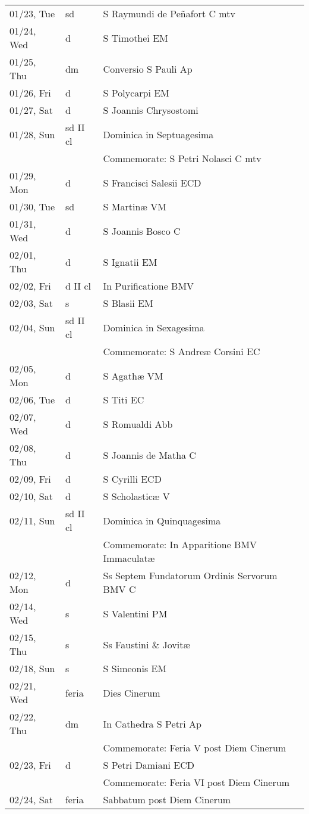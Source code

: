 \documentclass{article}
\begin{document}
\begin{longtable}{ l l l }
01/23, Tue & sd & S Raymundi de Peñafort C mtv\\
01/24, Wed & d & S Timothei EM\\
01/25, Thu & dm & Conversio S Pauli Ap\\
01/26, Fri & d & S Polycarpi EM\\
01/27, Sat & d & S Joannis Chrysostomi\\
01/28, Sun & sd II cl & Dominica in Septuagesima\\
 & & Commemorate: S Petri Nolasci C mtv\\
01/29, Mon & d & S Francisci Salesii ECD\\
01/30, Tue & sd & S Martinæ VM\\
01/31, Wed & d & S Joannis Bosco C\\
02/01, Thu & d & S Ignatii EM\\
02/02, Fri & d II cl & In Purificatione BMV\\
02/03, Sat & s & S Blasii EM\\
02/04, Sun & sd II cl & Dominica in Sexagesima\\
 & & Commemorate: S Andreæ Corsini EC\\
02/05, Mon & d & S Agathæ VM\\
02/06, Tue & d & S Titi EC\\
02/07, Wed & d & S Romualdi Abb\\
02/08, Thu & d & S Joannis de Matha C\\
02/09, Fri & d & S Cyrilli ECD\\
02/10, Sat & d & S Scholasticæ V\\
02/11, Sun & sd II cl & Dominica in Quinquagesima\\
 & & Commemorate: In Apparitione BMV Immaculatæ\\
02/12, Mon & d & Ss Septem Fundatorum Ordinis Servorum BMV C\\
02/14, Wed & s & S Valentini PM\\
02/15, Thu & s & Ss Faustini \& Jovitæ\\
02/18, Sun & s & S Simeonis EM\\
02/21, Wed & feria & Dies Cinerum\\
02/22, Thu & dm & In Cathedra S Petri Ap\\
 & & Commemorate: Feria V post Diem Cinerum\\
02/23, Fri & d & S Petri Damiani ECD\\
 & & Commemorate: Feria VI post Diem Cinerum\\
02/24, Sat & feria & Sabbatum post Diem Cinerum\\

\end{longtable}
\end{document}
